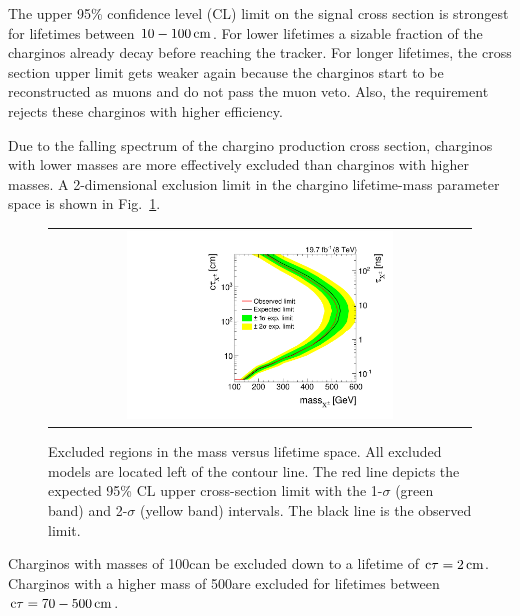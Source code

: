 The upper 95\% confidence level (CL) limit on the signal cross section is strongest for lifetimes between $10-100\,\text{cm}$.
For lower lifetimes a sizable fraction of the charginos already decay before reaching the tracker.
For longer lifetimes, the cross section upper limit gets weaker again because the charginos start to be reconstructed as muons and do not pass the muon veto.
Also, the \ecalo requirement rejects these charginos with higher efficiency.

Due to the falling spectrum of the chargino production cross section, charginos with lower masses are more effectively excluded than charginos with higher masses.
A 2-dimensional exclusion limit in the chargino lifetime-mass parameter space is shown in Fig.~\ref{fig:2dLimit}.
\begin{figure}[!h]
  \centering 
  \begin{tabular}{c}
    \includegraphics[width=0.65\textwidth]{figures/analysis/Interpretation/ExclusionLimits/LimitPlot_2d_log_cm.pdf} 
  \end{tabular}
  \caption{Excluded regions in the mass versus lifetime space.
           All excluded models are located left of the contour line.
            The red line depicts the expected 95\% CL upper cross-section limit with the 1-$\sigma$ (green band) and 2-$\sigma$ (yellow band) intervals.
           The black line is the observed limit.}
  \label{fig:2dLimit}
\end{figure} 

Charginos with masses of 100\gev can be excluded down to a lifetime of $\text{c}\tau=2\,\text{cm}$.
Charginos with a higher mass of 500\gev are excluded for lifetimes between $\text{c}\tau=70-500\,\text{cm}$.\\

